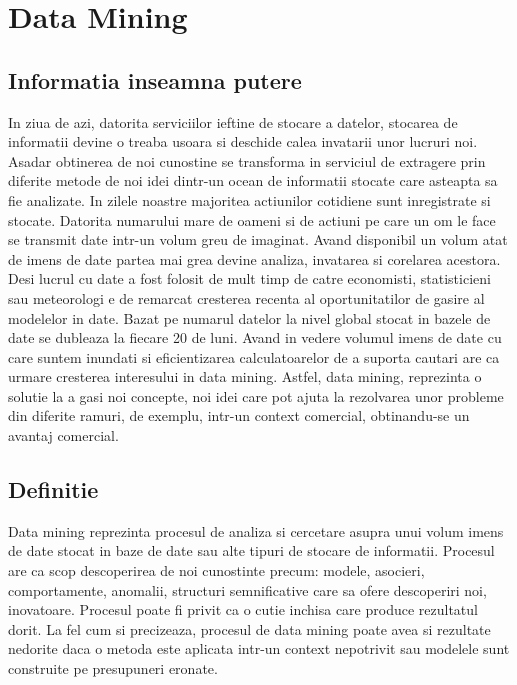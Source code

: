 
\chapter{Data Mining} %

\label{Chapter1} %


\section{Informatia inseamna putere}
In ziua de azi, datorita serviciilor ieftine de stocare a datelor, stocarea de informatii devine o treaba usoara si deschide calea invatarii unor lucruri noi. Asadar obtinerea de noi cunostine se transforma in serviciul de extragere prin diferite metode de noi idei  dintr-un ocean de informatii stocate care asteapta sa fie analizate. In zilele noastre majoritea actiunilor cotidiene sunt inregistrate si stocate. Datorita numarului mare de oameni si de actiuni pe care un om le face se transmit date intr-un volum greu de imaginat. Avand disponibil un volum atat de imens de date partea mai grea devine analiza, invatarea si corelarea acestora. Desi lucrul cu date a fost folosit de mult timp de catre economisti, statisticieni sau meteorologi e de remarcat cresterea recenta al oportunitatilor de gasire al modelelor in date. Bazat pe \cite{DMP2011} numarul datelor la nivel global stocat in bazele de date se dubleaza la fiecare 20 de luni. Avand in vedere volumul imens de date cu care suntem inundati si eficientizarea calculatoarelor de a suporta cautari are ca urmare cresterea interesului in data mining. Astfel, data mining, reprezinta o solutie la a gasi noi concepte, noi idei care pot ajuta la rezolvarea unor probleme din diferite ramuri, de exemplu, intr-un context comercial, obtinandu-se un avantaj comercial. 

\section{Definitie}
Data mining reprezinta procesul de analiza si cercetare asupra unui volum imens de date stocat in baze de date sau alte tipuri de stocare de informatii. Procesul are ca scop descoperirea de noi cunostinte precum: modele, asocieri, comportamente, anomalii, structuri semnificative care sa ofere descoperiri noi, inovatoare. Procesul poate fi privit ca o cutie inchisa care produce rezultatul dorit. La fel cum si \cite{Disco} precizeaza, procesul de data mining poate avea si rezultate nedorite daca o metoda este aplicata intr-un context nepotrivit sau modelele sunt construite pe presupuneri eronate.   


